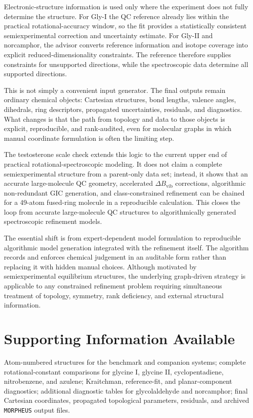 \documentclass[aip,jcp,reprint,longbibliography,floatfix]{revtex4-2}
\begin{document}
Electronic-structure information is used only where the experiment does not
fully determine the structure. For Gly-I the QC reference already lies within
the practical rotational-accuracy window, so the fit provides a
statistically consistent semiexperimental correction and uncertainty estimate.
For Gly-II and norcamphor, the advisor converts reference information and
isotope coverage into explicit reduced-dimensionality constraints. The
reference therefore supplies constraints for unsupported directions, while the
spectroscopic data determine all supported directions.

This is not simply a convenient input generator. The final outputs remain
ordinary chemical objects: Cartesian structures, bond lengths, valence angles,
dihedrals, ring descriptors, propagated uncertainties, residuals, and
diagnostics. What changes is that the path from topology and data to those
objects is explicit, reproducible, and rank-audited, even for molecular graphs
in which manual coordinate formulation is often the limiting step.

The testosterone scale check extends this logic to the current upper end of
practical rotational-spectroscopic modeling. It does not claim a complete
semiexperimental structure from a parent-only data set; instead, it shows that
an accurate large-molecule QC geometry, accelerated $\Delta B_\mathrm{vib}$
corrections, algorithmic non-redundant GIC generation, and class-constrained
refinement can be chained for a 49-atom fused-ring molecule in a
reproducible calculation. This closes the loop from accurate
large-molecule QC structures to algorithmically generated spectroscopic
refinement models.

The essential shift is from expert-dependent model formulation to reproducible
algorithmic model generation integrated with the refinement itself. The
algorithm records and enforces chemical judgement in an auditable form rather
than replacing it with hidden manual choices. Although motivated by
semiexperimental equilibrium structures, the underlying graph-driven strategy
is applicable to any constrained refinement problem requiring simultaneous
treatment of topology, symmetry, rank deficiency, and external structural
information.

\section*{Supporting Information Available}

Atom-numbered structures for the benchmark and companion systems; complete
rotational-constant comparisons for glycine I, glycine II, cyclopentadiene,
nitrobenzene, and azulene; Kraitchman, reference-fit, and planar-component
diagnostics; additional diagnostic tables for glycolaldehyde and norcamphor;
final Cartesian coordinates, propagated topological parameters, residuals, and
archived \texttt{MORPHEUS} output files.




\end{document}
